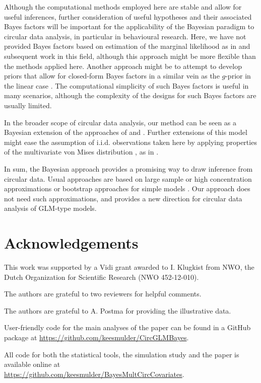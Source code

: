 Although the computational methods employed here are stable and allow for useful inferences, further consideration of useful hypotheses and their associated Bayes factors will be important for the applicability of the Bayesian paradigm to circular data analysis, in particular in behavioural research. Here, we have not provided Bayes factors based on estimation of the marginal likelihood as in \citet{chib1995marginal} and subsequent work in this field, although this approach might be more flexible than the methods applied here. Another approach might be to attempt to develop priors that allow for closed-form Bayes factors in a similar vein as the \(g\)-prior in the linear case \citep{zellner1986bayesian, liang2012mixtures}. The computational simplicity of such Bayes factors is useful in many scenarios, although the complexity of the designs for such Bayes factors are usually limited.

In the broader scope of circular data analysis, our method can be seen as a Bayesian extension of the approaches of \citet{artes2008hypothesis} and \citet{lagona2016regression}. Further extensions of this model might ease the assumption of i.i.d. observations taken here by applying properties of the multivariate von Mises distribution \citep{mardia2008multivariate, mardia2014some}, as in \citet{lagona2016regression}.

In sum, the Bayesian approach provides a promising way to draw inference from circular data. Usual approaches are based on large sample or high concentration approximations \citep{artes2008hypothesis} or bootstrap approaches for simple models \citep{baayen2012test, baayen2014evaluating}. Our approach does not need such approximations, and provides a new direction for circular data analysis of GLM-type models.

\section{Acknowledgements}

This work was supported by a Vidi grant awarded to I. Klugkist from NWO, the Dutch Organization for Scientific Research (NWO 452-12-010).

The authors are grateful to two reviewers for helpful comments.

The authors are grateful to A. Postma for providing the illustrative data.

User-friendly code for the main analyses of the paper can be found in a GitHub package at \url{https://github.com/keesmulder/CircGLMBayes}.

All code for both the statistical tools, the simulation study and the paper is available online at \\ \url{https://github.com/keesmulder/BayesMultCircCovariates}.





\newpage

